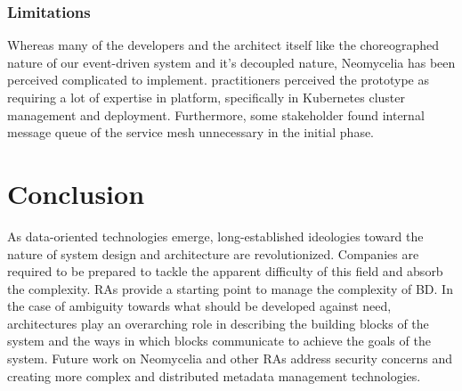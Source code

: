 \documentclass[conference]{IEEEtran}
\begin{document}
\subsubsection{Limitations}

Whereas many of the developers and the architect itself like the choreographed nature of our event-driven system and it's decoupled nature, Neomycelia has been perceived complicated to implement. practitioners perceived the prototype as requiring a lot of expertise in platform, specifically in Kubernetes cluster management and deployment. Furthermore, some stakeholder found internal message queue of the service mesh unnecessary in the initial phase.

\section{Conclusion}

As data-oriented technologies emerge, long-established ideologies toward the nature of system design and architecture are revolutionized. Companies are required to be prepared to tackle the apparent difficulty of this field and absorb the complexity. RAs provide a starting point to manage the complexity of BD. In the case of ambiguity towards what should be developed against need, architectures play an overarching role in describing the building blocks of the system and the ways in which blocks communicate to achieve the goals of the system. Future work on Neomycelia and other RAs address security concerns and creating more complex and distributed metadata management technologies.



\end{document}
